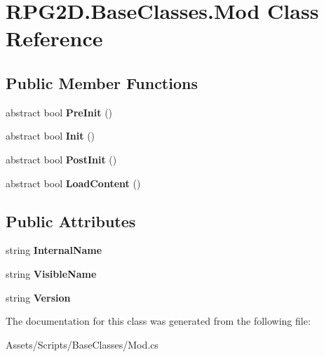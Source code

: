 \hypertarget{class_r_p_g2_d_1_1_base_classes_1_1_mod}{}\section{R\+P\+G2\+D.\+Base\+Classes.\+Mod Class Reference}
\label{class_r_p_g2_d_1_1_base_classes_1_1_mod}
\subsection*{Public Member Functions}
\begin{DoxyCompactItemize}
\item 
\mbox{\label{class_r_p_g2_d_1_1_base_classes_1_1_mod_a713fa8c3f8abf773c5dc0c1a73101d9c}} 
abstract bool {\bfseries Pre\+Init} ()
\item 
\mbox{\label{class_r_p_g2_d_1_1_base_classes_1_1_mod_aa7319cd9bf21558b1fbd8666194eb570}} 
abstract bool {\bfseries Init} ()
\item 
\mbox{\label{class_r_p_g2_d_1_1_base_classes_1_1_mod_ae1a325679395d1c744c4dbfdffff1dd3}} 
abstract bool {\bfseries Post\+Init} ()
\item 
\mbox{\label{class_r_p_g2_d_1_1_base_classes_1_1_mod_a6b9bd6a14be98d51afdc3b3b728ba5ba}} 
abstract bool {\bfseries Load\+Content} ()
\end{DoxyCompactItemize}
\subsection*{Public Attributes}
\begin{DoxyCompactItemize}
\item 
\mbox{\label{class_r_p_g2_d_1_1_base_classes_1_1_mod_a973a9ff3e8a8dd20602ae05aefc8ceac}} 
string {\bfseries Internal\+Name}
\item 
\mbox{\label{class_r_p_g2_d_1_1_base_classes_1_1_mod_aec1779aa5a67f86a3e9671e06c13717a}} 
string {\bfseries Visible\+Name}
\item 
\mbox{\label{class_r_p_g2_d_1_1_base_classes_1_1_mod_ab92ac6fe5a2edb348dcac666c81e5db5}} 
string {\bfseries Version}
\end{DoxyCompactItemize}


The documentation for this class was generated from the following file\+:\begin{DoxyCompactItemize}
\item 
Assets/\+Scripts/\+Base\+Classes/Mod.\+cs\end{DoxyCompactItemize}
